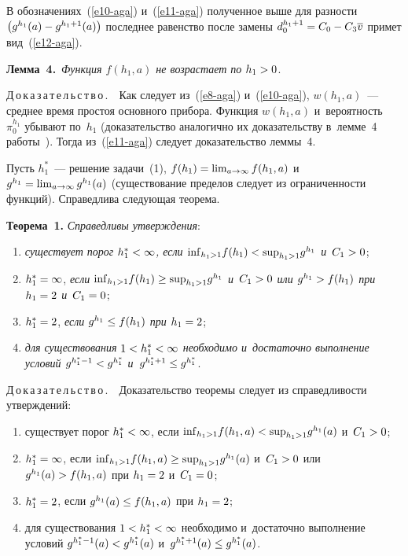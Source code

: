 \begin{multicols}{2}
\pagebreak
  
В обозначениях~(\ref{e10-aga}) и~(\ref{e11-aga}) полученное выше для 
разности $\left( g^{h_1}(a)\hm- g^{h_1+1}(a)\right)$ последнее равенство после 
замены $d_0^{h_1+1} \hm= C_0\hm- C_3\overline{v}$ примет вид~(\ref{e12-aga}).

\smallskip

\noindent
  \textbf{Лемма~4.}\ \textit{Функция $f(h_1,a)$ не возрастает по} 
$h_1\hm>0$.
  
  \smallskip
  
  \noindent
  Д\,о\,к\,а\,з\,а\,т\,е\,л\,ь\,с\,т\,в\,о\,.\ \  Как следует из~(\ref{e8-aga}) 
и~(\ref{e10-aga}), $w(h_1,a)$~--- среднее время простоя основного прибора. 
Функция $w(h_1,a)$ и~вероятность~$\pi_0^{h_1}$ убывают по~$h_1$ 
(доказательство аналогично их доказательству в~лемме~4 работы~\cite{6-aga}). 
Тогда из~(\ref{e11-aga}) следует доказательство леммы~4.
  
  Пусть $h_1^*$~--- решение задачи~(1), $f(h_1)\hm= \lim\nolimits_{a\to\infty} 
f(h_1,a)$ и~$g^{h_1}\hm= \lim\nolimits_{a\to\infty} g^{h_1}(a)$ (существование 
пределов следует из ограниченности функций). Справедлива следующая 
теорема. 



  
  \smallskip
  
  \noindent
  \textbf{Теорема~1.} \textit{Справедливы утверждения}: 
  \begin{enumerate}[(1)]
  \item \textit{существует 
порог $h_1^*\hm<\infty$, если $\mathrm{inf}_{h_1>1} f(h_1)\hm< \mathrm{sup}_{h_1>1} g^{h_1}$ 
и}~$C_1\hm>0$;
\item $h_1^*\hm=\infty$, \textit{если $\mathrm{inf}_{h_1>1} f(h_1) \hm\geq 
\mathrm{sup}_{h_1>1} g^{h_1}$ и~$C_1\hm>0$ или  $g^{h_1}\hm> f(h_1)$ при 
$h_1\hm=2$ и~$C_1\hm=0$}; 
\item $h_1^*\hm=2$, \textit{если $g^{h_1}\hm\leq f(h_1)$ 
при $h_1\hm=2$}; 
\item \textit{для существования $1\hm< h_1^* \hm<\infty$ необходимо 
и~достаточно выполнение условий $g^{h_1^*-1} \hm< g^{h_1^*}$ 
и}~$g^{h_1^*+1}\hm\leq g^{h_1^*}$.
\end{enumerate}
  
  \smallskip
  
  \noindent
  Д\,о\,к\,а\,з\,а\,т\,е\,л\,ь\,с\,т\,в\,о\,.\ \  Доказательство теоремы следует 
из справедливости утверждений: 
\begin{enumerate}[(1)]
\item существует порог $h_1^* \hm< \infty$, если 
$\mathrm{inf}_{h_1>1} f(h_1,a)\hm< \mathrm{sup}_{h_1>1} g^{h_1}(a)$ и~$C_1\hm>0$; 
\item $h_1^*\hm=\infty$, если $\mathrm{inf}_{h_1>1} f(h_1,a)\hm\geq \mathrm{sup}_{h_1>1} 
g^{h_1}(a)$ и~$C_1\hm>0$ или $g^{h_1}(a)\hm> f(h_1,a)$ при $h_1\hm=2$  
и~$C_1\hm=0$; 
\item $h_1^*\hm=2$, если $g^{h_1}(a)\hm\leq f(h_1,a)$ при 
$h_1\hm=2$; 
\item для существования $1\hm< h_1^*\hm< \infty$ необходимо 
и~достаточно выполнение условий $g^{h_1^*-1}(a)\hm< g^{h_1^*}(a)$ 
и~$g^{h_1^*+1}(a)\hm\leq g^{h_1^*}(a)$. 
\end{enumerate}
  

\end{multicols}
